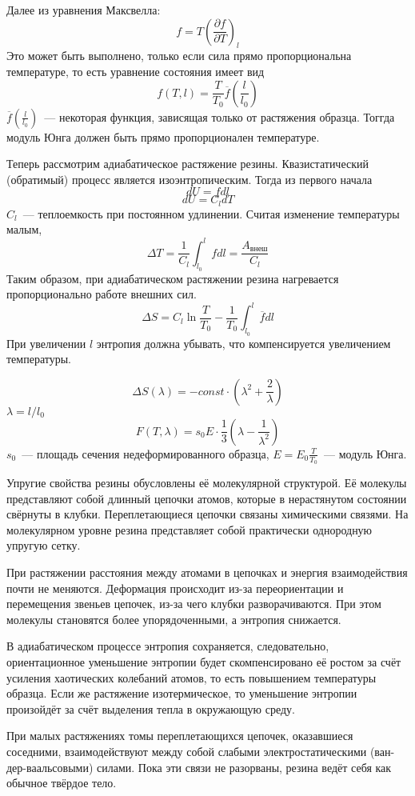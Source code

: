 Далее из уравнения Максвелла:
\[f=T\left(\frac{\partial f}{\partial T}\right)_l\]
Это может быть выполнено, только если сила прямо пропорциональна температуре, то есть
уравнение состояния имеет вид
\[f(T, l) = \frac{T}{T_0}\overline{f}\left(\frac{l}{l_0}\right)\]
$\overline{f}\left(\frac{l}{l_0}\right)$~--- некоторая функция, зависящая только от
растяжения образца. Тоггда модуль Юнга должен быть прямо пропорционален температуре.

Теперь рассмотрим адиабатическое растяжение резины. Квазистатический (обратимый) процесс
является изоэнтропическим. Тогда из первого начала
\[dU=fdl\]
\[dU=C_ldT\]
$C_l$~--- теплоемкость при постоянном удлинении. Считая изменение температуры малым,
\[\Delta T = \frac{1}{C_l}\int_{l_0}^lfdl=\frac{A_\text{внеш}}{C_l}\]
Таким образом, при адиабатическом растяжении резина нагревается пропорционально
работе внешних сил.
\[\Delta S = C_l\ln\frac{T}{T_0}-\frac{1}{T_0}\int_{l_0}^l\overline{f}dl\]
При увеличении $l$ энтропия должна убывать, что компенсируется увеличением температуры.

\[\Delta S(\lambda) = -const \cdot \left(\lambda^2+\frac{2}{\lambda}\right)\]
$\lambda = l/l_0$
\[F(T,\lambda) = s_0E\cdot\frac{1}{3}\left(\lambda-\frac{1}{\lambda^2}\right)\]
$s_0$~--- площадь сечения недеформированного образца, $E=E_0\frac{T}{T_0}$~---
модуль Юнга.

Упругие свойства резины обусловлены её молекулярной структурой. Её молекулы представляют
собой длинный цепочки атомов, которые в нерастянутом состоянии свёрнуты в клубки. 
Переплетающиеся цепочки связаны химическими связями. На молекулярном уровне резина
представляет собой практически однородную упругую сетку.

При растяжении расстояния между атомами в цепочках и энергия взаимодействия почти
не меняются. Деформация происходит из-за переориентации и перемещения звеньев
цепочек, из-за чего клубки разворачиваются. При этом молекулы становятся
более упорядоченными, а энтропия снижается.

В адиабатическом процессе энтропия сохраняется, следовательно, ориентационное
уменьшение энтропии будет скомпенсировано её ростом за счёт
усиления хаотических колебаний атомов, то есть повышением температуры
образца. Если же растяжение изотермическое, то уменьшение энтропии произойдёт
за счёт выделения тепла в окружающую среду.

При малых растяжениях томы переплетающихся цепочек,
оказавшиеся соседними, взаимодействуют между собой слабыми электростатическими
(ван-дер-ваальсовыми) силами. Пока эти связи не разорваны, резина ведёт себя
как обычное твёрдое тело.

